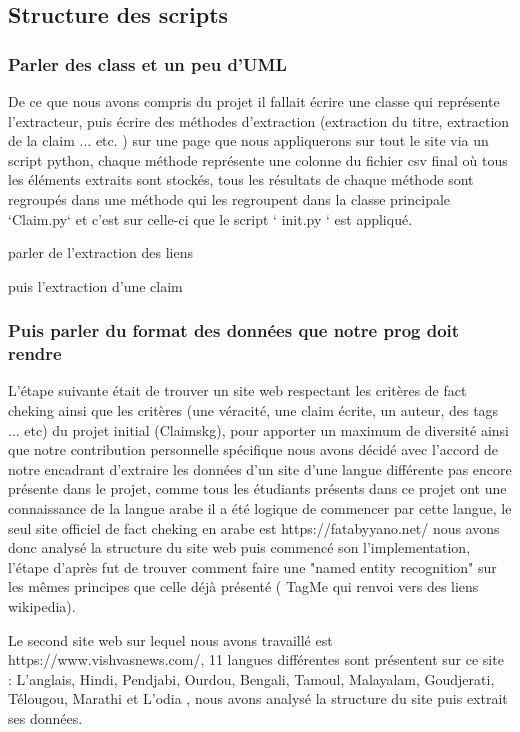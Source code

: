 \documentclass[oneside,13pt,a4paper]{report}
\begin{document}
\subsection{Structure des scripts}
\subsubsection*{Parler des class et un peu d'UML}

De ce que nous avons compris du projet il fallait écrire une classe qui représente l'extracteur, puis écrire des méthodes d'extraction (extraction du titre, extraction de la claim ... etc. ) sur une page que nous appliquerons sur tout le site via un script python, chaque méthode représente une colonne du fichier csv final où tous les éléments extraits sont stockés, tous les résultats de chaque méthode sont regroupés dans une méthode qui les regroupent dans la classe principale `Claim.py` et c'est sur celle-ci que le script ` init.py ` est appliqué.

parler de l'extraction des liens

puis l'extraction d'une claim

\subsubsection*{Puis parler du format des données que notre prog doit rendre}

L'étape suivante était de trouver un site web respectant les critères de fact cheking ainsi que les critères (une véracité, une claim écrite, un auteur, des tags ... etc) du projet initial (Claimskg), pour apporter un maximum de diversité ainsi que notre contribution personnelle spécifique nous avons décidé avec l'accord de notre encadrant d'extraire les données d'un site d'une langue différente pas encore présente dans le projet, comme tous les étudiants présents dans ce projet ont une connaissance de la langue arabe il a été logique de commencer par cette langue, le seul site officiel de fact cheking en arabe est https://fatabyyano.net/ nous avons donc analysé la structure du site web puis commencé son l'implementation, l'étape d'après fut de trouver comment faire une "named entity recognition" sur les mêmes principes que celle déjà présenté ( TagMe qui renvoi vers des liens wikipedia).

Le second site web sur lequel nous avons travaillé est https://www.vishvasnews.com/, 11 langues différentes sont présentent sur ce site : L'anglais, Hindi, Pendjabi, Ourdou, Bengali, Tamoul, Malayalam, Goudjerati, Télougou, Marathi et L'odia , nous avons analysé la structure du site puis extrait ses données.
\end{document}
